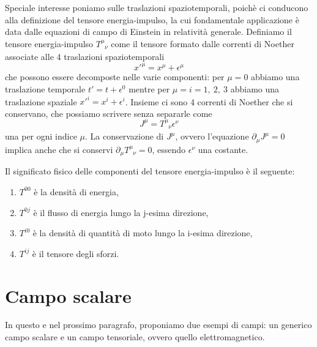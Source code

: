     Speciale interesse poniamo sulle traslazioni spaziotemporali, poichè ci conducono alla definizione del tensore energia-impulso, la cui fondamentale applicazione è data dalle equazioni di campo di Einstein in relatività generale. 
    Definiamo il tensore energia-impulso $T^\mu_{\phantom \mu \nu}$ come il tensore formato dalle correnti di Noether associate alle 4 traslazioni spaziotemporali
    \begin{equation*}
        x'^\mu = x^\mu + \epsilon^\mu
    \end{equation*}
    che possono essere decomposte nelle varie componenti: per $\mu=0$ abbiamo una traslazione temporale $t' = t + \epsilon^0$ mentre per $\mu=i=1,~2,~3$ abbiamo una traslazione spaziale $x'^i = x^i + \epsilon^i$. Insieme ci sono 4 correnti di Noether che si conservano, che possiamo scrivere senza separarle come 
    \begin{equation} \label{tensenimp}
        J^\mu = T^\mu_{\phantom \mu \nu} \epsilon^\nu
    \end{equation}
    una per ogni indice $\mu$. La conservazione di $J^\mu$, ovvero l'equazione $\partial_\mu J^\mu = 0 $ implica anche che si conservi $\partial_\mu T^\mu_{\phantom \mu \nu} = 0$, essendo $\epsilon^\nu$ una costante.

    Il significato fisico delle componenti del tensore energia-impulso è il seguente: 
    \begin{enumerate}
        \item $T^{00}$ è la densità di energia,
        \item $T^{0j}$ è il flusso di energia lungo la j-esima direzione,
        \item $T^{i0}$ è la densità di quantità di moto lungo la i-esima direzione,
        \item $T^{ij}$ è il tensore degli sforzi.
    \end{enumerate}

\section{Campo scalare}

    In questo e nel prossimo paragrafo, proponiamo due esempi di campi: un generico campo scalare e un campo tensoriale, ovvero quello elettromagnetico.

    \hfill

